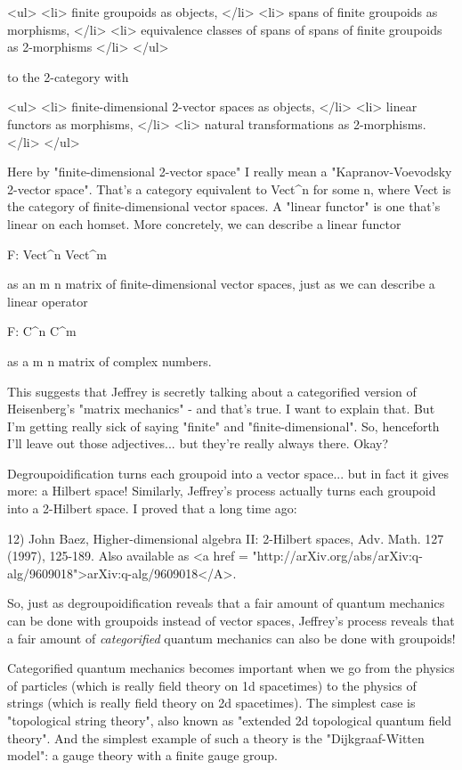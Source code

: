 <ul>
<li>
finite groupoids as objects,
</li>
<li>
spans of finite groupoids as morphisms,
</li>
<li>
equivalence classes of spans of spans of finite groupoids as 2-morphisms
</li>
</ul>

to the 2-category with

<ul>
<li>
finite-dimensional 2-vector spaces as objects,
</li>
<li>
linear functors as morphisms,
</li>
<li>
natural transformations as 2-morphisms.
</li>
</ul>

Here by "finite-dimensional 2-vector space" I really mean a
"Kapranov-Voevodsky 2-vector space".  That's a category
equivalent to Vect^{n} for some n, where Vect is the category
of finite-dimensional vector spaces.  A "linear functor" is
one that's linear on each homset.  More concretely, we can describe a
linear functor

F: Vect^{n} \to  Vect^{m}

as an m \times  n matrix of finite-dimensional vector spaces, just as
we can describe a linear operator

F: C^{n} \to  C^{m} 

as a m \times  n matrix of complex numbers.

This suggests that Jeffrey is secretly talking about a categorified
version of Heisenberg's "matrix mechanics" - and that's
true.  I want to explain that.  But I'm getting really sick of saying
"finite" and "finite-dimensional".  So, henceforth
I'll leave out those adjectives... but they're really always there.
Okay?

Degroupoidification turns each groupoid into a vector space... but 
in fact it gives more: a Hilbert space!  Similarly, Jeffrey's process 
actually turns each groupoid into a 2-Hilbert space.  I proved that
a long time ago:

12) John Baez, Higher-dimensional algebra II: 2-Hilbert spaces,
Adv. Math. 127 (1997), 125-189.  Also available as <a href =
"http://arXiv.org/abs/arXiv:q-alg/9609018">arXiv:q-alg/9609018</A>.

So, just as degroupoidification reveals that a fair amount of quantum
mechanics can be done with groupoids instead of vector spaces,
Jeffrey's process reveals that a fair amount of \emph{categorified}
quantum mechanics can also be done with groupoids!

Categorified quantum mechanics becomes important when we go from the
physics of particles (which is really field theory on 1d spacetimes)
to the physics of strings (which is really field theory on 2d
spacetimes).  The simplest case is "topological string
theory", also known as "extended 2d topological quantum
field theory".  And the simplest example of such a theory is the
"Dijkgraaf-Witten model": a gauge theory with a finite gauge
group.

